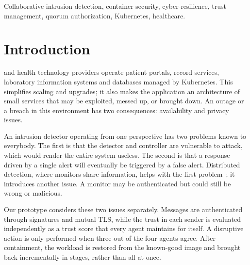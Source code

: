 \documentclass[journal]{IEEEtran}
\begin{document}
\begin{IEEEkeywords}
Collaborative intrusion detection, container security, cyber-resilience, trust management, quorum authorization, Kubernetes, healthcare.
\end{IEEEkeywords}

\section{Introduction}
 and health technology providers operate patient portals, record services, laboratory information systems and databases managed by Kubernetes. This simplifies scaling and upgrades; it also makes the application an architecture of small services that may be exploited, messed up, or brought down. An outage or a breach in this environment has two consequences: availability and privacy issues.

An intrusion detector operating from one perspective has two problems known to everybody. The first is that the detector and controller are vulnerable to attack, which would render the entire system useless. The second is that a response driven by a single alert will eventually be triggered by a false alert. Distributed detection, where monitors share information, helps with the first problem~\cite{zhou10,vasilo15,li22}; it introduces another issue. A monitor may be authenticated but could still be wrong or malicious.

Our prototype considers these two issues separately. Messages are authenticated through signatures and mutual TLS, while the trust in each sender is evaluated independently as a trust score that every agent maintains for itself. A disruptive action is only performed when three out of the four agents agree. After containment, the workload is restored from the known-good image and brought back incrementally in stages, rather than all at once.
\end{document}

